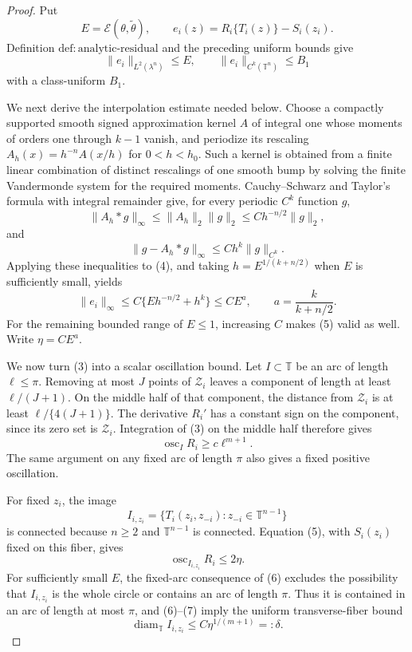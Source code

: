 \documentclass{article}
\begin{document}
\begin{proof}
Put
\[
E=\mathcal E(\theta,\widetilde\theta),
\qquad
e_i(z)=R_i\{T_i(z)\}-S_i(z_i).
\]
Definition \(\mathrm{def:analytic\text{-}residual}\) and the preceding uniform bounds give
\[
\lVert e_i\rVert_{L^2(\lambda^n)}\leq E,
\qquad
\lVert e_i\rVert_{C^k(\mathbb T^n)}\leq B_1
\tag{4}
\]
with a class-uniform \(B_1\).

We next derive the interpolation estimate needed below.  Choose a compactly supported smooth signed approximation kernel \(A\) of integral one whose moments of orders one through \(k-1\) vanish, and periodize its rescaling \(A_h(x)=h^{-n}A(x/h)\) for \(0<h<h_0\).  Such a kernel is obtained from a finite linear combination of distinct rescalings of one smooth bump by solving the finite Vandermonde system for the required moments.  Cauchy--Schwarz and Taylor's formula with integral remainder give, for every periodic \(C^k\) function \(g\),
\[
\lVert A_h*g\rVert_\infty
\leq \lVert A_h\rVert_2\lVert g\rVert_2
\leq C h^{-n/2}\lVert g\rVert_2,
\]
and
\[
\lVert g-A_h*g\rVert_\infty
\leq C h^k\lVert g\rVert_{C^k}.
\]
Applying these inequalities to (4), and taking \(h=E^{1/(k+n/2)}\) when \(E\) is sufficiently small, yields
\[
\lVert e_i\rVert_\infty
\leq C\{E h^{-n/2}+h^k\}
\leq C E^a,
\qquad
a=\frac{k}{k+n/2}.
\tag{5}
\]
For the remaining bounded range of \(E\leq1\), increasing \(C\) makes (5) valid as well.  Write \(\eta=CE^a\).

We now turn (3) into a scalar oscillation bound.  Let \(I\subset\mathbb T\) be an arc of length \(\ell\leq\pi\).  Removing at most \(J\) points of \(\mathcal Z_i\) leaves a component of length at least \(\ell/(J+1)\).  On the middle half of that component, the distance from \(\mathcal Z_i\) is at least \(\ell/\{4(J+1)\}\).  The derivative \(R_i'\) has a constant sign on the component, since its zero set is \(\mathcal Z_i\).  Integration of (3) on the middle half therefore gives
\[
\operatorname{osc}_{I}R_i
\geq c\ell^{m+1}.
\tag{6}
\]
The same argument on any fixed arc of length \(\pi\) also gives a fixed positive oscillation.

For fixed \(z_i\), the image
\[
I_{i,z_i}=\{T_i(z_i,z_{-i}):z_{-i}\in\mathbb T^{n-1}\}
\]
is connected because \(n\geq2\) and \(\mathbb T^{n-1}\) is connected.  Equation (5), with \(S_i(z_i)\) fixed on this fiber, gives
\[
\operatorname{osc}_{I_{i,z_i}}R_i\leq2\eta.
\tag{7}
\]
For sufficiently small \(E\), the fixed-arc consequence of (6) excludes the possibility that \(I_{i,z_i}\) is the whole circle or contains an arc of length \(\pi\).  Thus it is contained in an arc of length at most \(\pi\), and (6)--(7) imply the uniform transverse-fiber bound
\[
\operatorname{diam}_{\mathbb T} I_{i,z_i}
\leq C\eta^{1/(m+1)}=:\delta.
\tag{8}
\]


\end{proof}
\end{document}
